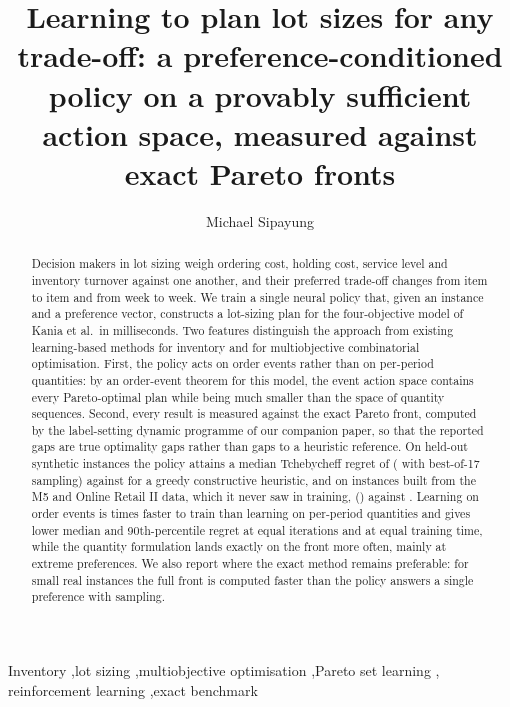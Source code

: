 \documentclass[preprint,12pt,authoryear]{elsarticle}
\begin{document}
\begin{frontmatter}
\title{Learning to plan lot sizes for any trade-off: a preference-conditioned policy on a provably
sufficient action space, measured against exact Pareto fronts}

\author[unimed]{Michael Sipayung}
\address[unimed]{Department of Physics, Universitas Negeri Medan, Medan, Indonesia}

\begin{abstract}
Decision makers in lot sizing weigh ordering cost, holding cost, service level and inventory
turnover against one another, and their preferred trade-off changes from item to item and from
week to week. We train a single neural policy that, given an instance and a preference vector,
constructs a lot-sizing plan for the four-objective model of Kania et al.\ in milliseconds. Two
features distinguish the approach from existing learning-based methods for inventory and for
multiobjective combinatorial optimisation. First, the policy acts on order events rather than on
per-period quantities: by an order-event theorem for this model, the event action space contains
every Pareto-optimal plan while being much smaller than the space of quantity sequences. Second,
every result is measured against the exact Pareto front, computed by the label-setting dynamic
programme of our companion paper, so that the reported gaps are true optimality gaps rather than
gaps to a heuristic reference. On  held-out synthetic instances the policy attains a
median Tchebycheff regret of  ( with best-of-17 sampling) against
 for a greedy constructive heuristic, and on  instances built from the
M5 and Online Retail II data, which it never saw in training, 
() against . Learning on order events is  times
faster to train than learning on per-period quantities and gives lower median and 90th-percentile
regret at equal iterations and at equal training time, while the quantity formulation lands
exactly on the front more often, mainly at extreme preferences.
We also report where the exact method remains preferable: for small real instances the full
front is computed faster than the policy answers a single preference with sampling.
\end{abstract}

\begin{keyword}
Inventory \sep lot sizing \sep multiobjective optimisation \sep Pareto set learning \sep
reinforcement learning \sep exact benchmark
\end{keyword}
\end{frontmatter}
\end{document}
